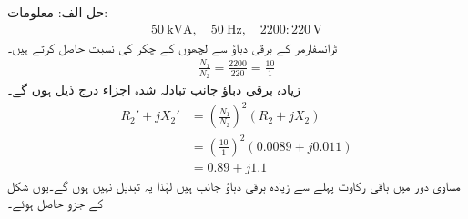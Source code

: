 حل الف:\quad
معلومات:
\begin{align*}
\SI{50}{\kilo \volt \ampere}, \quad \SI{50}{\hertz}, \quad 2200:220\,\si{\volt}
\end{align*}
ٹرانسفارمر کے  برقی دباؤ سے لچھوں کے چکر کی نسبت  حاصل کرتے ہیں۔
\begin{align*}
\frac{N_1}{N_2}=\frac{2200}{220}=\frac{10}{1}
\end{align*}
زیادہ برقی دباؤ جانب تبادلہ شدہ اجزاء درج ذیل ہوں گے۔
\begin{align*}
R_2'+j X_2' &=\left(\frac{N_1}{N_2} \right)^2 \left(R_2+j X_2 \right)\\
&=\left(\frac{10}{1} \right)^2 \left(0.0089+j 0.011 \right)\\
&=0.89+j 1.1
\end{align*}
مساوی دور میں باقی  رکاوٹ پہلے سے زیادہ برقی دباؤ جانب ہیں لہٰذا یہ تبدیل نہیں ہوں گے۔یوں شکل   کے جزو حاصل ہوئے۔

